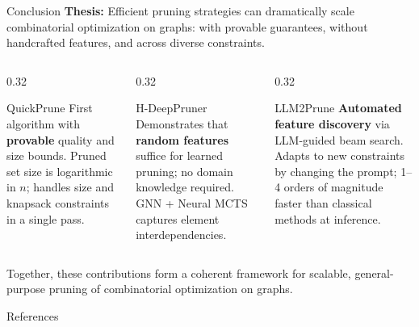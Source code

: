 \documentclass[aspectratio=169,xcolor=dvipsnames,8pt]{beamer}
\begin{document}
\begin{frame}{Conclusion}
  \textbf{Thesis:} Efficient pruning strategies can dramatically scale combinatorial
  optimization on graphs: with provable guarantees, without handcrafted features,
  and across diverse constraints.

  \vspace{0.3cm}

  \begin{columns}[T]
    \begin{column}{0.32\textwidth}
      \begin{block}{QuickPrune}
        First algorithm with \textbf{provable} quality and size bounds. Pruned set
        size is logarithmic in $n$; handles size and knapsack constraints in a single
        pass.
      \end{block}
    \end{column}
    \begin{column}{0.32\textwidth}
      \begin{block}{H-DeepPruner}
        Demonstrates that \textbf{random features} suffice for learned pruning;
        no domain knowledge required. GNN + Neural MCTS captures element
        interdependencies.
      \end{block}
    \end{column}
    \begin{column}{0.32\textwidth}
      \begin{block}{LLM2Prune}
        \textbf{Automated feature discovery} via LLM-guided beam search. Adapts to
        new constraints by changing the prompt; 1--4 orders of magnitude faster than
        classical methods at inference.
      \end{block}
    \end{column}
  \end{columns}

  \vspace{0.3cm}
  \centering
  Together, these contributions form a coherent framework for scalable,
  general-purpose pruning of combinatorial optimization on graphs.
\end{frame}


\begin{frame}{References}
  
  
\end{frame}
\end{document}
